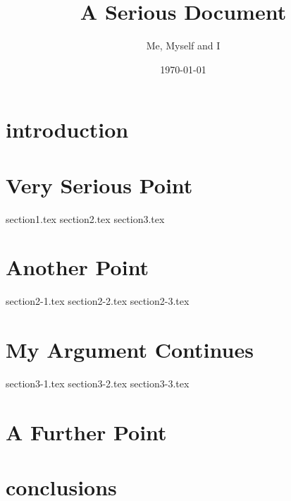 \documentclass[a4paper]{report}
\title{A Serious Document}
\author{Me, Myself and I}
\date{\today}
\begin{document}
\maketitle

\tableofcontents
\pagebreak

\begin{abstract}

\end{abstract}

\chapter{introduction}


\chapter{Very Serious Point}
{section1.tex}
{section2.tex}
{section3.tex}

\chapter{Another Point}
{section2-1.tex}
{section2-2.tex}
{section2-3.tex}

\chapter{My Argument Continues}
{section3-1.tex}
{section3-2.tex}
{section3-3.tex}

\chapter{A Further Point}


\chapter{conclusions}

\appendix
\end{document}
